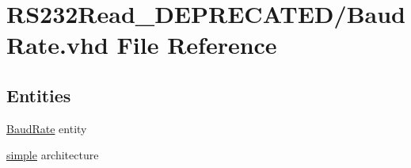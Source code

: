 \hypertarget{_r_s232_read___d_e_p_r_e_c_a_t_e_d_2_baud_rate_8vhd}{}\section{R\+S232\+Read\+\_\+\+D\+E\+P\+R\+E\+C\+A\+T\+E\+D/\+Baud\+Rate.vhd File Reference}
\label{_r_s232_read___d_e_p_r_e_c_a_t_e_d_2_baud_rate_8vhd}
\subsection*{Entities}
\begin{DoxyCompactItemize}
\item 
\hyperlink{class_baud_rate}{Baud\+Rate} entity
\item 
\hyperlink{class_baud_rate_1_1simple}{simple} architecture
\end{DoxyCompactItemize}
